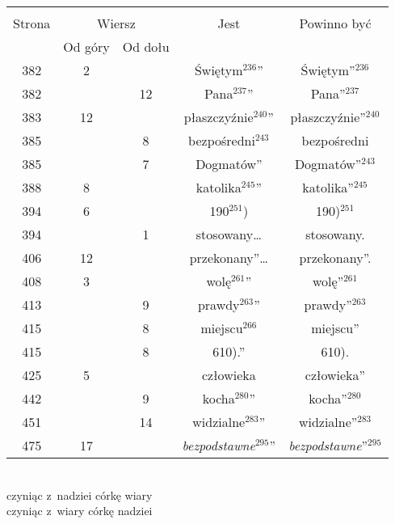 \documentclass[a4paper,11pt]{article}
\begin{document}
\begin{center}
  \begin{tabular}{|c|c|c|c|c|}
    \hline
    & \multicolumn{2}{c|}{} & & \\
    Strona & \multicolumn{2}{c|}{Wiersz} & Jest
                              & Powinno być \\ \cline{2-3}
    & Od góry & Od dołu & & \\
    \hline
    382 &  2 & & Świętym$^{ 236 }$'' & Świętym''$^{ 236 }$ \\
    382 & & 12 & Pana$^{ 237 }$'' & Pana''$^{ 237 }$ \\
    383 & 12 & & płaszczyźnie$^{ 240 }$'' & płaszczyźnie''$^{ 240 }$ \\
    385 & &  8 & bezpośredni$^{ 243 }$ & bezpośredni \\
    385 & &  7 & Dogmatów'' & Dogmatów''$^{ 243 }$ \\
    388 &  8 & & katolika$^{ 245 }$'' & katolika''$^{ 245 }$ \\
    394 &  6 & & 190$^{ 251 }$) & 190)$^{ 251 }$ \\
    394 & &  1 & stosowany\ldots & stosowany. \\
    406 & 12 & & przekonany''\ldots & przekonany''. \\
    408 &  3 & & wolę$^{ 261 }$'' & wolę''$^{ 261 }$ \\
    413 & &  9 & prawdy$^{ 263 }$'' & prawdy''$^{ 263 }$ \\
    415 & &  8 & miejscu$^{ 266 }$ & miejscu'' \\
    415 & &  8 & 610).'' & 610). \\
    425 &  5 & & człowieka & człowieka'' \\
    442 & &  9 & kocha$^{ 280 }$'' & kocha''$^{ 280 }$ \\
    451 & & 14 & widzialne$^{ 283 }$'' & widzialne''$^{ 283 }$ \\
    475 & 17 & & \emph{bezpodstawne}$^{ 295 }$''
           & \emph{bezpodstawne}''$^{ 295 }$ \\
    \hline
  \end{tabular}
\end{center}
\noindent
{} \\
\Jest  czyniąc z~nadziei córkę wiary \\
\Powin czyniąc z~wiary córkę nadziei \\
\end{document}
